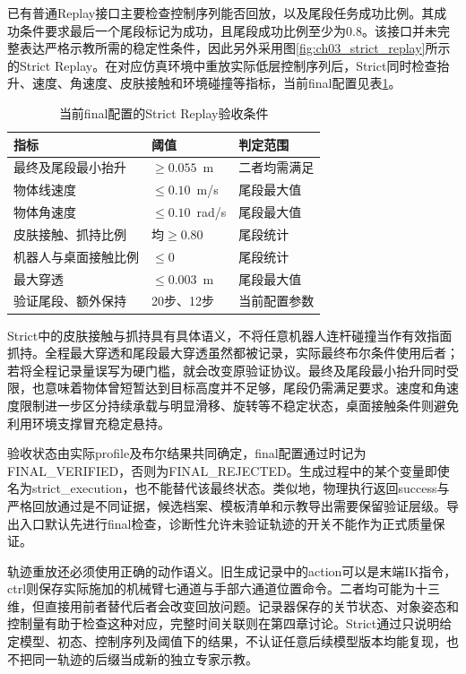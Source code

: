 已有普通Replay接口主要检查控制序列能否回放，以及尾段任务成功比例。其成功条件要求最后一个尾段标记为成功，且尾段成功比例至少为0.8。该接口并未完整表达严格示教所需的稳定性条件，因此另外采用图\ref{fig:ch03_strict_replay}所示的Strict Replay。在对应仿真环境中重放实际低层控制序列后，Strict同时检查抬升、速度、角速度、皮肤接触和环境碰撞等指标，当前final配置见表\ref{tab:ch03_strict_thresholds}。

\begin{table}[htbp]
 \centering\small
 \caption{当前final配置的Strict Replay验收条件}
 \label{tab:ch03_strict_thresholds}
 \begin{tabular}{p{}p{}p{}}
 \hline
 指标 & 阈值 & 判定范围\\
 \hline
 最终及尾段最小抬升 & $\geq0.055$~m & 二者均需满足\\
 物体线速度 & $\leq0.10$~m/s & 尾段最大值\\
 物体角速度 & $\leq0.10$~rad/s & 尾段最大值\\
 皮肤接触、抓持比例 & 均$\geq0.80$ & 尾段统计\\
 机器人与桌面接触比例 & $\leq0$ & 尾段统计\\
 最大穿透 & $\leq0.003$~m & 尾段最大值\\
 验证尾段、额外保持 & 20步、12步 & 当前配置参数\\
 \hline
 \end{tabular}
\end{table}

Strict中的皮肤接触与抓持具有具体语义，不将任意机器人连杆碰撞当作有效指面抓持。全程最大穿透和尾段最大穿透虽然都被记录，实际最终布尔条件使用后者；若将全程记录量误写为硬门槛，就会改变原验证协议。最终及尾段最小抬升同时受限，也意味着物体曾短暂达到目标高度并不足够，尾段仍需满足要求。速度和角速度限制进一步区分持续承载与明显滑移、旋转等不稳定状态，桌面接触条件则避免利用环境支撑冒充稳定悬持。

验收状态由实际profile及布尔结果共同确定，final配置通过时记为FINAL\_VERIFIED，否则为FINAL\_REJECTED。生成过程中的某个变量即使名为strict\_execution，也不能替代该最终状态。类似地，物理执行返回success与严格回放通过是不同证据，候选档案、模板清单和示教导出需要保留验证层级。导出入口默认先进行final检查，诊断性允许未验证轨迹的开关不能作为正式质量保证。

轨迹重放还必须使用正确的动作语义。旧生成记录中的action可以是末端IK指令，ctrl则保存实际施加的机械臂七通道与手部六通道位置命令。二者均可能为十三维，但直接用前者替代后者会改变回放问题。记录器保存的关节状态、对象姿态和控制量有助于检查这种对应，完整时间关联则在第四章讨论。Strict通过只说明给定模型、初态、控制序列及阈值下的结果，不认证任意后续模型版本均能复现，也不把同一轨迹的后缀当成新的独立专家示教。

